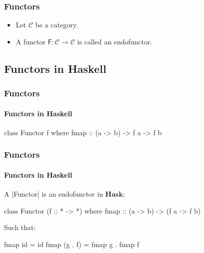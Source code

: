 \documentclass{beamer}
\newcommand{\cat}[1]{\ensuremath{\mathcal{#1}}}
\newcommand{\catbf}[1]{\ensuremath{\mathbf{#1}}\xspace}
\newcommand{\hask}{\catbf{Hask}}
\newcommand{\func}[1]{\ensuremath{\mathsf{#1}}}
\begin{document}
\begin{frame}[label={def:endofunctor}]
  \frametitle{Functors}

  \begin{definition}[Endofunctor]
    \begin{itemize}
    \item
      Let \cat{C} be a category.
    \item
      A functor $\func{F}: \cat{C} \to \cat{C}$ is called an
      endofunctor.
    \end{itemize}
  \end{definition}

\end{frame}


\subsection{Functors in Haskell}


\begin{frame}[fragile]
  \frametitle{Functors}
  \framesubtitle{Functors in Haskell}

  \begin{definition}
    \begin{code}
class Functor f where
  fmap :: (a -> b) -> f a -> f b
    \end{code}
  \end{definition}

\end{frame}


\begin{frame}[fragile]
  \frametitle{Functors}
  \framesubtitle{Functors in Haskell}

  \begin{definition}
    A |Functor| is an endofunctor in \hask:
    \begin{code}
class Functor (f :: * -> *) where
  fmap :: (a -> b) -> (f a -> f b)
    \end{code}
    Such that:
    \begin{code}
fmap id      = id
fmap (g . f) = fmap g . fmap f
    \end{code}
  \end{definition}

\end{frame}
\end{document}
